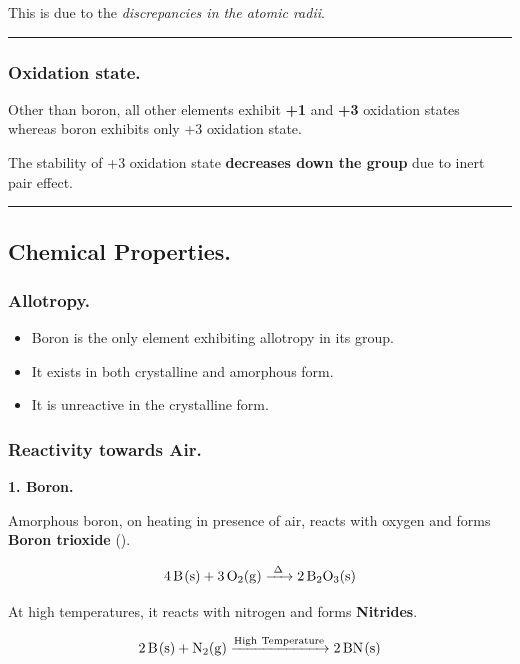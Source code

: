 \documentclass[twocolumn]{article}
\begin{document}
\begin{CJK*}{UTF8}{gbsn}
This is due to the \textit{discrepancies in the atomic radii}. 

\vspace*{0.1in} 
\hrule 

\subsubsection*{Oxidation state.}

Other than boron, all other elements exhibit \textbf{+1}  and \textbf{+3} oxidation states whereas boron exhibits only +3 oxidation state.
\vspace*{0.1in} 

The stability of +3 oxidation state \textbf{decreases down the group} due to inert pair effect. 

\vspace*{0.1in}
\hrule

\subsection*{Chemical Properties.}

\subsubsection*{Allotropy.}

\begin{itemize}
    \item Boron is the only element exhibiting allotropy in its group. 
    \item It exists in both crystalline and amorphous form.
    \item It is unreactive in the crystalline form. 
\end{itemize}

\subsubsection*{Reactivity towards Air.}

\textbf{1. Boron.} 
\vspace*{0.1in} 

Amorphous boron, on heating in presence of air, reacts with oxygen and forms \textbf{Boron trioxide} ().

\[
    \ce{ 4B(s) + 3O2(g) ->[\Delta] 2B2O3(s) } 
\]

At high temperatures, it reacts with nitrogen and forms \textbf{Nitrides}. 

\[
    \ce{ 2B(s) + N2(g) ->[High\ Temperature] 2BN(s) } 
\]


\end{CJK*}
\end{document}
